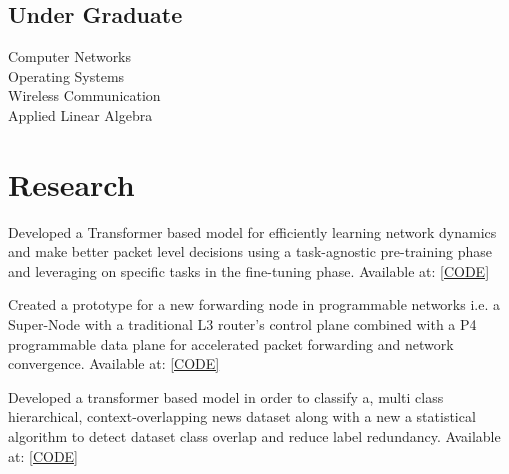 \documentclass[]{onepage}
\begin{document}
\begin{minipage}[t]{0.33\textwidth}
\subsection{Under Graduate}
Computer Networks \\
Operating Systems \\
Wireless Communication \\
Applied Linear Algebra \\

%
%

\end{minipage} 
\hfill
\begin{minipage}[t]{0.66\textwidth} 


\section{Research}

Developed a Transformer based model for efficiently learning network dynamics and make better packet level decisions using a task-agnostic pre-training phase and leveraging on specific tasks in the fine-tuning phase. Available at: {\href{https://github.com/Siddhant-Ray/Packet-Transformer}{[CODE]}}
\smallsectionsep

Created a prototype for a new forwarding node in programmable networks i.e. a Super-Node with a traditional L3 router's control plane combined with a P4 programmable data plane for accelerated packet forwarding and network convergence. Available at: {\href{https://github.com/Siddhant-Ray/FRR-P4-Super-Node-Prototype}{[CODE]}}
\smallsectionsep

Developed a transformer based model in order to classify a, multi class hierarchical, context-overlapping news dataset along with a new a statistical algorithm to detect dataset class overlap and reduce label redundancy. Available at: {\href{https://github.com/Siddhant-Ray/Attentive-neural-networks-for-news-classification}{[CODE]}}
\smallsectionsep


\end{minipage}
\end{document}
